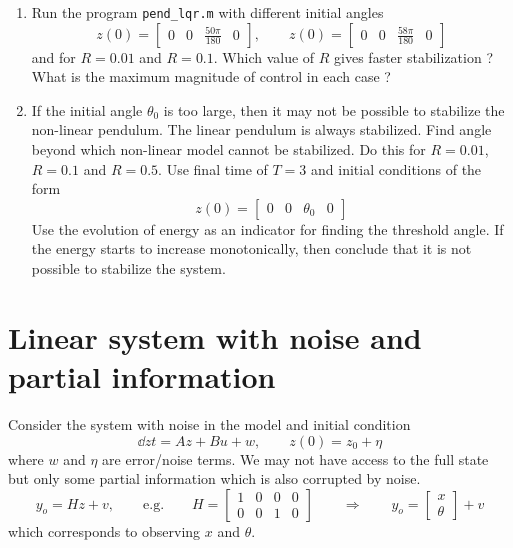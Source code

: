 \documentclass[12pt]{article}
\begin{document}
\begin{enumerate}
\item Run the program {\tt pend\_lqr.m} with different initial angles
\[
z(0) = \begin{bmatrix}
0 & 0 & \frac{50 \pi}{180} & 0 
\end{bmatrix}, \qquad z(0) = \begin{bmatrix}
0 & 0 & \frac{58 \pi}{180} & 0 
\end{bmatrix}
\]
and for $R=0.01$ and $R=0.1$. Which value of $R$ gives faster stabilization ? What is the maximum magnitude of control in each case ? 

\item If the initial angle $\theta_0$ is too large, then it may not be possible to stabilize the non-linear pendulum. The linear pendulum is always stabilized. Find angle beyond which non-linear model cannot be stabilized. Do this for $R=0.01$, $R=0.1$ and $R=0.5$. Use final time of $T=3$ and initial conditions of the form 
\[
z(0) = \begin{bmatrix}
0 & 0 & \theta_0 & 0 
\end{bmatrix}
\]
Use the evolution of energy as an indicator for finding the threshold angle. If the energy starts to increase monotonically, then conclude that it is not possible to stabilize the system.

\end{enumerate}

\section{Linear system with noise and partial information}
Consider the system with noise in the model and initial condition
\[
\dd{z}{t} = Az + Bu + w, \qquad z(0) = z_0 + \eta
\]
where $w$ and $\eta$ are error/noise terms. We may not have access to the full state but only some partial information which is also corrupted by noise.
\[
y_o = Hz  + v, \qquad \textrm{e.g.} \qquad H = \begin{bmatrix}
1 & 0 & 0 & 0 \\
0 & 0 & 1 & 0 \end{bmatrix} \qquad \Longrightarrow \qquad y_o = \begin{bmatrix}
x \\ \theta \end{bmatrix} + v
\]
which corresponds to observing $x$ and $\theta$.

\vspace{5mm}
\end{document}
